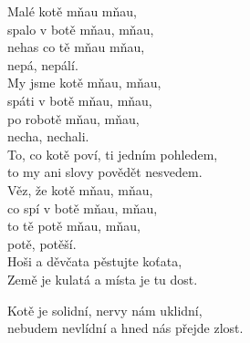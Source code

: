 
\nv{}Malé kotě mňau mňau,\\
spalo v botě mňau, mňau,\\
nehas co tě mňau mňau,\\
nepá, nepálí.\\
\vinv
\nv My jsme kotě mňau, mňau,\\
spáti v botě mňau, mňau,\\
po robotě mňau, mňau,\\
necha, nechali.\\
\vinv
\nv{}To, co kotě poví, ti jedním pohledem,\\
to my ani slovy povědět nesvedem.\\
\vinv
\nv Věz, že kotě mňau, mňau,\\
co spí v botě mňau, mňau,\\
to tě potě mňau, mňau,\\
potě, potěší.\\
\vinv
\nv{}Hoši a děvčata pěstujte koťata,\\
Země je kulatá a místa je tu dost.
\vspace{5mm}

\nv Kotě je solidní, nervy nám uklidní,\\
nebudem nevlídní a hned nás přejde zlost.


\newpage
